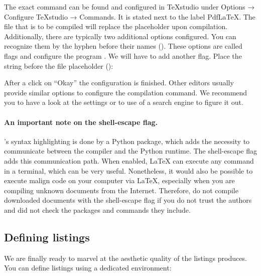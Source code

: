 
\noindent The exact command can be found and configured in \TeX{}studio under Options → Configure \TeX{}studio → Commands.
It is stated next to the label Pdf\LaTeX{}.
The file that is to be compiled will replace the placeholder  upon compilation.
Additionally, there are typically two additional options configured.
You can recognize them by the hyphen before their names ().
These options are called flags and configure the program . 
We will have to add another flag.
Place the string  before the file placeholder ():


\noindent After a click on \enquote{Okay} the configuration is finished.
Other editors usually provide similar options to configure the compilation command.
We recommend you to have a look at the settings or to use of a search engine to figure it out.

\paragraph{An important note on the shell-escape flag.} 's syntax highlighting is done by a Python package, which adds the necessity to communicate between the compiler and the Python runtime.
The shell-escape flag adds this communication path.
When enabled, \LaTeX{} can execute any command in a terminal, which can be very useful.
Nonetheless, it would also be possible to execute malign code on your computer via \LaTeX{}, especially when you are compiling unknown documents from the Internet.
Therefore, do not compile downloaded documents with the shell-escape flag if you do not trust the authors and did not check the packages and commands they include.

\subsection{Defining listings}
We are finally ready to marvel at the aesthetic quality of the listings  produces.
You can define listings using a dedicated environment:



